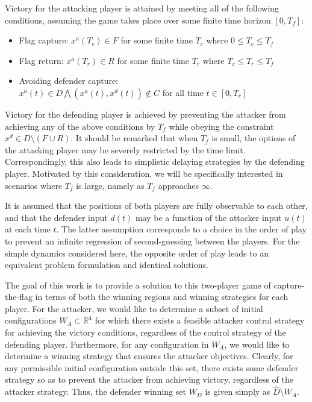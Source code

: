 \documentclass[letterpaper, 10 pt, conference]{ieeeconf}  %
\numberwithin{algorithm}{section}
\begin{document}
Victory for the attacking player is attained by meeting all of the following conditions, assuming the game takes place over some finite time horizon $[0, T_f]$:
\begin{itemize}
\item{Flag capture: $x^a(T_c) \in F$ for some finite time $T_c$ where $0 \leq T_c \leq T_f$ }
\item{Flag return:  $x^a(T_r) \in R$ for some finite time $T_r $ where $T_c \leq T_r \leq T_f$}
\item{Avoiding defender capture: \\
$x^a(t) \in D \bigwedge (x^a(t), x^d(t)) \not \in C$ for all time $t \in [0, T_r] $} 
\end{itemize}
Victory for the defending player is achieved by preventing the attacker from achieving any of the above conditions by $T_f$ while obeying the constraint $x^d \in D \setminus (F \cup R)$. It should be remarked that when $T_f$ is small, the options of the attacking player may be severely restricted by the time limit. Correspondingly, this also leads to simplistic delaying strategies by the defending player. Motivated by this consideration, we will be specifically interested in scenarios where $T_f$ is large, namely as $T_f$ approaches $\infty$.

It is assumed that the positions of both players are fully observable to each other, and that the defender input $d(t)$ may be a function of the attacker input $u(t)$ at each time $t$. The latter assumption corresponds to a choice in the order of play to prevent an infinite regression of second-guessing between the players. For the simple dynamics considered here, the opposite order of play leads to an equivalent problem formulation and identical solutions.

The goal of this work is to provide a solution to this two-player game of capture-the-flag in terms of both the winning regions and winning strategies for each player. For the attacker, we would like to determine a subset of initial configurations $W_A \subset \mathbb{R}^4$ for which there exists a feasible attacker control strategy for achieving the victory conditions, regardless of the control strategy of the defending player. Furthermore, for any configuration in $W_A$, we would like to determine a winning strategy that ensures the attacker objectives. Clearly, for any permissible initial configuration outside this set, there exists some defender strategy so as to prevent the attacker from achieving victory, regardless of the attacker strategy. Thus, the defender winning set $W_D$ is given simply as $\hat{D} \setminus W_A$. 
\end{document}
